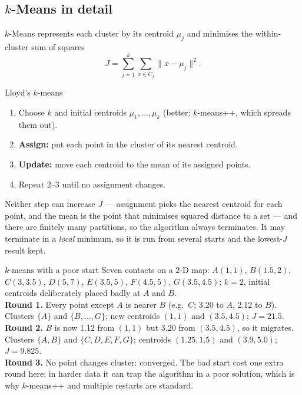 \documentclass[11pt]{article}
\begin{document}
\subsection{$k$-Means in detail}
$k$-Means represents each cluster by its centroid $\mu_j$ and minimises the within-cluster sum of squares
\[J=\sum_{j=1}^k\sum_{x\in C_j}\|x-\mu_j\|^2.\]
\begin{algo}{Lloyd's $k$-means}
\begin{enumerate}[leftmargin=1.5em]
\item Choose $k$ and initial centroids $\mu_1,\ldots,\mu_k$ (better: $k$-means++, which spreads them out).
\item \textbf{Assign:} put each point in the cluster of its nearest centroid.
\item \textbf{Update:} move each centroid to the mean of its assigned points.
\item Repeat 2--3 until no assignment changes.
\end{enumerate}
\end{algo}
Neither step can increase $J$ --- assignment picks the nearest centroid for each point, and the mean is the point that minimises squared distance to a set --- and there are finitely many partitions, so the algorithm always terminates. It may terminate in a \emph{local} minimum, so it is run from several starts and the lowest-$J$ result kept.
\begin{example}{$k$-means with a poor start}
Seven contacts on a $2$-D map: $A(1,1)$, $B(1.5,2)$, $C(3,3.5)$, $D(5,7)$, $E(3.5,5)$, $F(4.5,5)$, $G(3.5,4.5)$; $k=2$, initial centroids deliberately placed badly at $A$ and $B$.\\[2pt]
\textbf{Round 1.} Every point except $A$ is nearer $B$ (e.g.\ $C$: 3.20 to $A$, 2.12 to $B$). Clusters $\{A\}$ and $\{B,\ldots,G\}$; new centroids $(1,1)$ and $(3.5,4.5)$; $J=21.5$.\\
\textbf{Round 2.} $B$ is now 1.12 from $(1,1)$ but 3.20 from $(3.5,4.5)$, so it migrates. Clusters $\{A,B\}$ and $\{C,D,E,F,G\}$; centroids $(1.25,1.5)$ and $(3.9,5.0)$; $J=9.825$.\\
\textbf{Round 3.} No point changes cluster: converged. The bad start cost one extra round here; in harder data it can trap the algorithm in a poor solution, which is why $k$-means++ and multiple restarts are standard.
\end{example}
\end{document}
